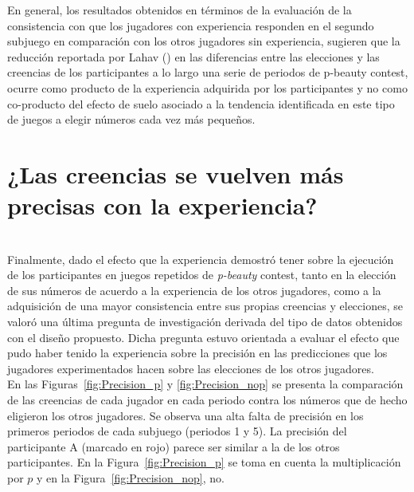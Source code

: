 En general, los resultados obtenidos en términos de la evaluación de la consistencia con que los jugadores con experiencia responden en el segundo subjuego en comparación con los otros jugadores sin experiencia, sugieren que la reducción reportada por Lahav (\citeyear{Lahav}) en las diferencias entre las elecciones y las creencias de los participantes a lo largo una serie de periodos de p-beauty contest, ocurre como producto de la experiencia adquirida por los participantes y no como co-producto del efecto de suelo asociado a la tendencia identificada en este tipo de juegos a elegir números cada vez más pequeños.\\

\section{¿Las creencias se vuelven más precisas con la experiencia?}\\

Finalmente, dado el efecto que la experiencia demostró tener sobre la ejecución de los participantes en juegos repetidos de \textit{p-beauty} contest, tanto en la elección de sus números de acuerdo a la experiencia de los otros jugadores, como a la adquisición de una mayor consistencia entre sus propias creencias y elecciones, se valoró una última pregunta de investigación derivada del tipo de datos obtenidos con el diseño propuesto. Dicha pregunta estuvo orientada a evaluar el efecto que pudo haber tenido la experiencia sobre la precisión en las predicciones que los jugadores experimentados hacen sobre las elecciones de los otros jugadores.\\

En las Figuras~\ref{fig:Precision_p} y \ref{fig:Precision_nop} se presenta la comparación de las creencias de cada jugador en cada periodo contra los números que de hecho eligieron los otros jugadores. Se observa una alta falta de precisión en los primeros periodos de cada subjuego (periodos 1 y 5). La precisión del participante A (marcado en rojo) parece ser similar a la de los otros participantes. En la Figura~\ref{fig:Precision_p} se toma en cuenta la multiplicación por $p$ y en la Figura~\ref{fig:Precision_nop}, no.\\
   

